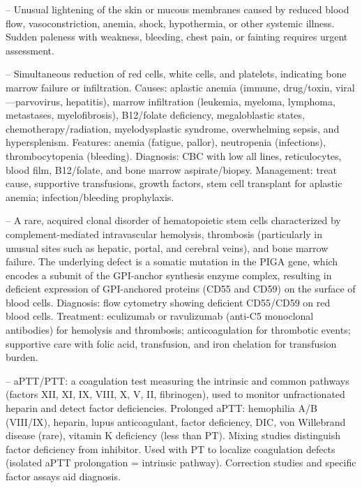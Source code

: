 -- Unusual lightening of the skin or mucous membranes caused by reduced blood flow, vasoconstriction, anemia, shock, hypothermia, or other systemic illness. Sudden paleness with weakness, bleeding, chest pain, or fainting requires urgent assessment.

-- Simultaneous reduction of red cells, white cells, and platelets, indicating bone marrow failure or infiltration. Causes: aplastic anemia (immune, drug/toxin, viral—parvovirus, hepatitis), marrow infiltration (leukemia, myeloma, lymphoma, metastases, myelofibrosis), B12/folate deficiency, megaloblastic states, chemotherapy/radiation, myelodysplastic syndrome, overwhelming sepsis, and hypersplenism. Features: anemia (fatigue, pallor), neutropenia (infections), thrombocytopenia (bleeding). Diagnosis: CBC with low all lines, reticulocytes, blood film, B12/folate, and bone marrow aspirate/biopsy. Management: treat cause, supportive transfusions, growth factors, stem cell transplant for aplastic anemia; infection/bleeding prophylaxis.

-- A rare, acquired clonal disorder of hematopoietic stem cells characterized by complement-mediated intravascular hemolysis, thrombosis (particularly in unusual sites such as hepatic, portal, and cerebral veins), and bone marrow failure. The underlying defect is a somatic mutation in the PIGA gene, which encodes a subunit of the GPI-anchor synthesis enzyme complex, resulting in deficient expression of GPI-anchored proteins (CD55 and CD59) on the surface of blood cells. Diagnosis: flow cytometry showing deficient CD55/CD59 on red blood cells. Treatment: eculizumab or ravulizumab (anti-C5 monoclonal antibodies) for hemolysis and thrombosis; anticoagulation for thrombotic events; supportive care with folic acid, transfusion, and iron chelation for transfusion burden.

-- aPTT/PTT: a coagulation test measuring the intrinsic and common pathways (factors XII, XI, IX, VIII, X, V, II, fibrinogen), used to monitor unfractionated heparin and detect factor deficiencies. Prolonged aPTT: hemophilia A/B (VIII/IX), heparin, lupus anticoagulant, factor deficiency, DIC, von Willebrand disease (rare), vitamin K deficiency (less than PT). Mixing studies distinguish factor deficiency from inhibitor. Used with PT to localize coagulation defects (isolated aPTT prolongation = intrinsic pathway). Correction studies and specific factor assays aid diagnosis.

